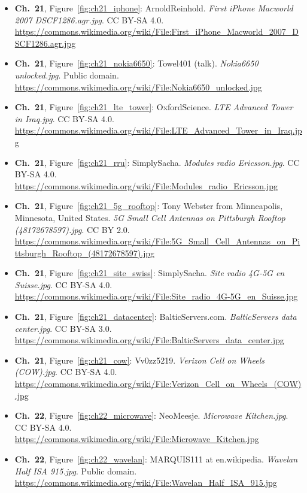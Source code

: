 \begin{small}
\begin{itemize}[leftmargin=0pt,itemsep=2pt,label={}]
\item \textbf{Ch.~21}, Figure~\ref{fig:ch21_iphone}: ArnoldReinhold. \emph{First iPhone Macworld 2007 DSCF1286.\allowbreak{}agr.\allowbreak{}jpg}. CC BY-SA 4.0. \url{https://commons.wikimedia.org/wiki/File:First_iPhone_Macworld_2007_DSCF1286.agr.jpg}
\item \textbf{Ch.~21}, Figure~\ref{fig:ch21_nokia6650}: Towel401 (talk). \emph{Nokia6650 unlocked.\allowbreak{}jpg}. Public domain. \url{https://commons.wikimedia.org/wiki/File:Nokia6650_unlocked.jpg}
\item \textbf{Ch.~21}, Figure~\ref{fig:ch21_lte_tower}: OxfordScience. \emph{LTE Advanced Tower in Iraq.\allowbreak{}jpg}. CC BY-SA 4.0. \url{https://commons.wikimedia.org/wiki/File:LTE_Advanced_Tower_in_Iraq.jpg}
\item \textbf{Ch.~21}, Figure~\ref{fig:ch21_rru}: SimplySacha. \emph{Modules radio Ericsson.\allowbreak{}jpg}. CC BY-SA 4.0. \url{https://commons.wikimedia.org/wiki/File:Modules_radio_Ericsson.jpg}
\item \textbf{Ch.~21}, Figure~\ref{fig:ch21_5g_rooftop}: Tony Webster from Minneapolis, Minnesota, United States. \emph{5G Small Cell Antennas on Pittsburgh Rooftop (48172678597).\allowbreak{}jpg}. CC BY 2.0. \url{https://commons.wikimedia.org/wiki/File:5G_Small_Cell_Antennas_on_Pittsburgh_Rooftop_(48172678597).jpg}
\item \textbf{Ch.~21}, Figure~\ref{fig:ch21_site_swiss}: SimplySacha. \emph{Site radio 4G-\allowbreak{}5G en Suisse.\allowbreak{}jpg}. CC BY-SA 4.0. \url{https://commons.wikimedia.org/wiki/File:Site_radio_4G-5G_en_Suisse.jpg}
\item \textbf{Ch.~21}, Figure~\ref{fig:ch21_datacenter}: BalticServers.com. \emph{BalticServers data center.\allowbreak{}jpg}. CC BY-SA 3.0. \url{https://commons.wikimedia.org/wiki/File:BalticServers_data_center.jpg}
\item \textbf{Ch.~21}, Figure~\ref{fig:ch21_cow}: Vv0zz5219. \emph{Verizon Cell on Wheels (COW).\allowbreak{}jpg}. CC BY-SA 4.0. \url{https://commons.wikimedia.org/wiki/File:Verizon_Cell_on_Wheels_(COW).jpg}
\item \textbf{Ch.~22}, Figure~\ref{fig:ch22_microwave}: NeoMeesje. \emph{Microwave Kitchen.\allowbreak{}jpg}. CC BY-SA 4.0. \url{https://commons.wikimedia.org/wiki/File:Microwave_Kitchen.jpg}
\item \textbf{Ch.~22}, Figure~\ref{fig:ch22_wavelan}: MARQUIS111 at en.wikipedia. \emph{Wavelan Half ISA 915.\allowbreak{}jpg}. Public domain. \url{https://commons.wikimedia.org/wiki/File:Wavelan_Half_ISA_915.jpg}

\end{itemize}
\end{small}
